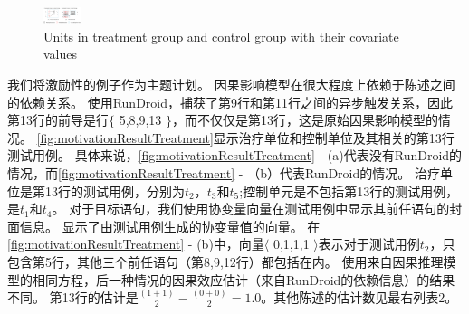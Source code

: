\begin{figure}[!h]
	\includegraphics[width=0.1\textwidth]{./Figures/treatment.png}
	\caption{Units in treatment group and control group with their covariate values}
	\label{fig:motivationResultTreatment}
\end{figure}
{

我们将激励性的例子作为主题计划。
因果影响模型在很大程度上依赖于陈述之间的依赖关系。
使用RunDroid，捕获了第9行和第11行之间的异步触发关系，因此第13行的前导是行$ \{ $ 5,8,9,13 $ \} $，而不仅仅是第13行，这是原始因果影响模型的情况。
\autoref {fig:motivationResultTreatment}显示治疗单位和控制单位及其相关的第13行测试用例。
具体来说，\autoref {fig:motivationResultTreatment} - (a)代表没有RunDroid的情况，而\autoref {fig:motivationResultTreatment} - （b）代表RunDroid的情况。
治疗单位是第13行的测试用例，分别为$ t_2 $，$ t_3 $和$ t_5 $;控制单元是不包括第13行的测试用例，是$ t_1 $和$ t_4 $。
对于目标语句，我们使用协变量向量在测试用例中显示其前任语句的封面信息。
显示了由测试用例生成的协变量值的向量。
在\autoref {fig:motivationResultTreatment} - (b)中，向量$ \langle $ 0,1,1,1 $ \rangle $表示对于测试用例$ t_2 $，只包含第5行，其他三个前任语句（第8,9,12行）都包括在内。
使用来自因果推理模型的相同方程，后一种情况的因果效应估计（来自RunDroid的依赖信息）的结果不同。
第13行的估计是$ \frac {(1 + 1)} {2} - \frac {(0 + 0)} {2} = 1.0 $。其他陈述的估计数见最右列表2。


}
